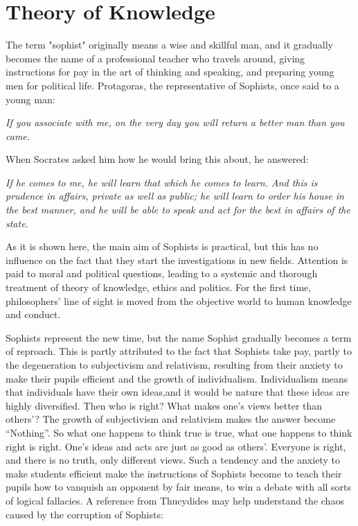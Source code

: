 \documentclass[11pt]{article}
\begin{document}
\section{Theory of Knowledge}
The term "sophist" originally means a wise and skillful man, and it gradually becomes the name of a professional teacher who travels around, giving instructions for pay in the art of thinking and speaking, and preparing young men for political life. 
Protagoras, the representative of Sophists, once said to a young man:
  
\textit{If you associate with me, on the very day you will return a better man than you came.}

When Socrates asked him how he would bring this about, he answered:

\textit{If he comes to me, he will learn that which he comes to learn. And this is prudence in affairs, private as well as public; he will learn to order his house in the best manner, and he will be able to speak and act for the best in affairs of the state.}

As it is shown here, the main aim of Sophists is practical, but this has no influence on the fact that they start the investigations in new fields. 
Attention is paid to moral and political questions, leading to a systemic and thorough treatment of theory of knowledge, ethics and politics. 
For the first time, philosophers’ line of sight is moved from the objective world to human knowledge and conduct. 

\newline

Sophists represent the new time, but the name Sophist gradually becomes a term of reproach. 
This is partly attributed to the fact that Sophists take pay, partly to the degeneration to subjectivism and relativism, resulting from their anxiety to make their pupils efficient and the growth of individualism. 
Individualism means that individuals have their own ideas,and it would be nature that these ideas are highly diversified. 
Then who is right? 
What makes one’s views better than others’? 
The growth of subjectivism and relativism makes the answer become “Nothing”. 
So what one happens to think true is true, what one happens to think right is right. 
One’s ideas and acts are just as good as others’. 
Everyone is right, and there is no truth, only different views. 
Such a tendency and the anxiety to make students efficient make the instructions of Sophists become to teach their pupils how to vanquish an opponent by fair means, to win a debate with all sorts of logical fallacies. 
A reference from Thucydides may help understand the chaos caused by the corruption of Sophists:
  
\end{document}
